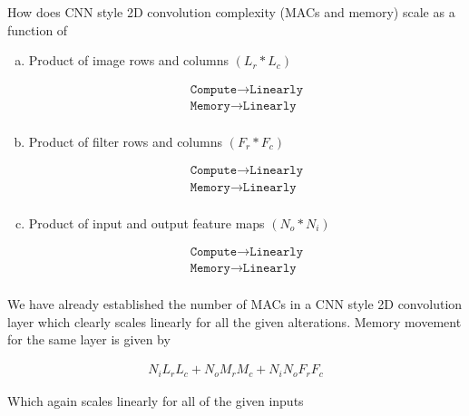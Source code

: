 \documentclass[11pt]{article}
\begin{document}
How does CNN style 2D convolution complexity (MACs and memory) scale as a
function of
\begin{enumerate}[(a)]\itemsep0pt
	\item Product of image rows and columns $(L_r*L_c)$
		\begin{solution}
			\begin{align}
				\texttt{Compute} \rightarrow \texttt{Linearly} \\
				\texttt{Memory} \rightarrow \texttt{Linearly} \\
			\end{align}
		\end{solution}
	\item Product of filter rows and columns $(F_r*F_c)$
		\begin{solution}
			\begin{align}
				\texttt{Compute} \rightarrow \texttt{Linearly} \\
				\texttt{Memory} \rightarrow \texttt{Linearly} \\
			\end{align}
		\end{solution}
	\item Product of input and output feature maps $(N_o * N_i)$
		\begin{solution}
			\begin{align}
				\texttt{Compute} \rightarrow \texttt{Linearly} \\
				\texttt{Memory} \rightarrow \texttt{Linearly} \\
			\end{align}
		\end{solution}
\end{enumerate}

We have already established the number of MACs in a CNN style 2D convolution
layer which clearly scales linearly for all the given alterations. Memory
movement for the same layer is given by

\begin{align}
	N_i L_r L_c + N_o M_r M_c + N_i N_o F_r F_c
\end{align}

Which again scales linearly for all of the given inputs
\end{document}
